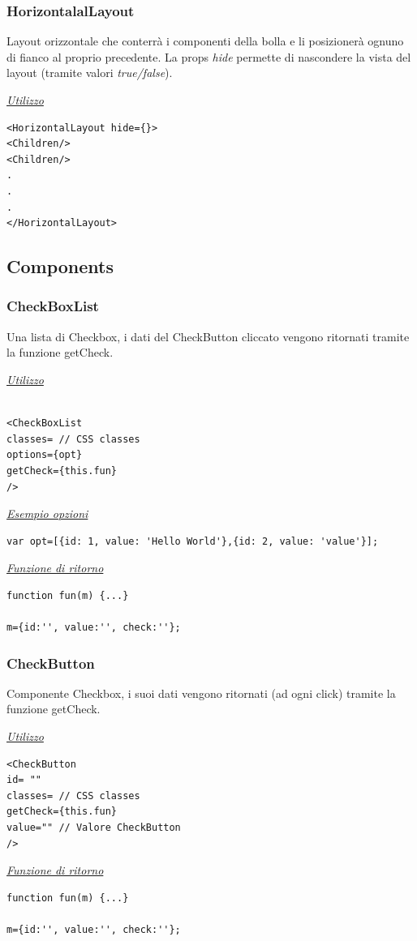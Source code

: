 \subsubsection{HorizontalalLayout}
Layout orizzontale che conterrà i componenti della bolla e li posizionerà ognuno di fianco al proprio precedente. La props \textit{hide} permette di nascondere la vista del layout (tramite valori \textit{true/false}).
\begin{center}
\underline{\textit{Utilizzo}}
\begin{lstlisting}
<HorizontalLayout hide={}>
<Children/>
<Children/>
.
.
.
</HorizontalLayout>
\end{lstlisting}
\end{center}

\subsection{Components}
\subsubsection{CheckBoxList}
Una lista di Checkbox, i dati del CheckButton cliccato vengono ritornati tramite la funzione getCheck.
\begin{center}
\underline{\textit{Utilizzo}}
\begin{lstlisting}

<CheckBoxList
classes= // CSS classes
options={opt}
getCheck={this.fun}
/>
\end{lstlisting}
\underline{\textit{Esempio opzioni}}
\begin{lstlisting}
var opt=[{id: 1, value: 'Hello World'},{id: 2, value: 'value'}];
\end{lstlisting}
\underline{\textit{Funzione di ritorno}}
\begin{lstlisting}
function fun(m) {...}

m={id:'', value:'', check:''};
\end{lstlisting}
\end{center}

\subsubsection{CheckButton}

Componente Checkbox, i suoi dati vengono ritornati (ad ogni click) tramite la funzione getCheck.
\begin{center}
\underline{\textit{Utilizzo}}
\begin{lstlisting}
<CheckButton
id= ""
classes= // CSS classes
getCheck={this.fun}
value="" // Valore CheckButton
/>
\end{lstlisting}
\underline{\textit{Funzione di ritorno}}
\begin{lstlisting}
function fun(m) {...}

m={id:'', value:'', check:''};
\end{lstlisting}
\end{center}

